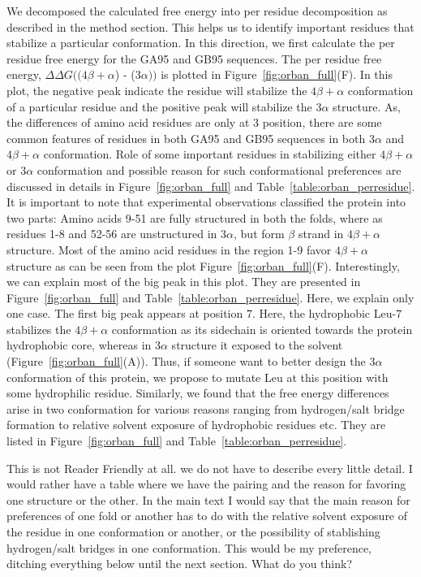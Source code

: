 \documentclass[12pt]{article}
\newcommand{\Alberto}[1]{\color{ForestGreen}#1\normalcolor }
\begin{document}
We decomposed the calculated free energy into per residue decomposition as described in the method
section. This helps us to identify important residues that stabilize a particular conformation. 
In this direction, we first calculate the per residue free energy for the GA95 and GB95 sequences. 
The per residue free energy, $\Delta \Delta G ((4 \beta + \alpha$) - ($3 \alpha))$ is plotted in Figure~\ref{fig:orban_full}(F).
In this plot, the negative peak indicate the residue will stabilize the $4 \beta + \alpha$ conformation of a particular
residue and the positive peak will stabilize the $3 \alpha$ structure. As, the differences of amino acid
residues are only at 3 position, there are some common features of residues in both GA95 and GB95 sequences in both
$3 \alpha$ and $4 \beta + \alpha$ conformation. Role of some important residues in stabilizing either 
$4 \beta + \alpha$ or $3 \alpha$ conformation and possible reason for such conformational preferences are discussed in 
details in Figure~\ref{fig:orban_full} and Table~\ref{table:orban_perresidue}. It is important to note that
experimental observations classified the protein into two parts: Amino acids 9-51 are fully structured in both
the folds, where as residues 1-8 and 52-56 are unstructured in $3 \alpha$, but form $\beta$ strand in $4 \beta + \alpha$ structure.
Most of the amino acid residues in the region 1-9 favor $4 \beta + \alpha$ structure as can be seen from the plot
Figure~\ref{fig:orban_full}(F). Interestingly, we can explain most of the big peak in this plot. They are presented 
in Figure~\ref{fig:orban_full} and Table~\ref{table:orban_perresidue}. Here, we explain only one case. The first big peak
appears at position 7. Here, the hydrophobic Leu-7 stabilizes the $4 \beta + \alpha$ conformation as its sidechain is oriented 
towards the protein hydrophobic core, whereas in $3 \alpha$ structure it exposed to the solvent (Figure~\ref{fig:orban_full}(A)).
Thus, if someone want to better design the $3 \alpha$ conformation of this protein, we propose to mutate Leu at this position
with some hydrophilic residue. Similarly, we found that the free energy differences arise in two conformation for various 
reasons ranging from hydrogen/salt bridge formation to relative solvent exposure of hydrophobic residues etc. They are 
listed in Figure~\ref{fig:orban_full} and Table~\ref{table:orban_perresidue}.     


\Alberto{This is not Reader Friendly at all. we do not have to describe every little detail. I would
    rather have a table where we have the pairing and the reason for favoring one structure or the
    other. In the main text I would say that the main reason for preferences of one fold or another
    has to do with the relative solvent exposure of the residue in one conformation or another, or
    the possibility of stablishing hydrogen/salt bridges in one conformation. This would be my
preference, ditching everything below until the next section. What do you think?}
\end{document}
